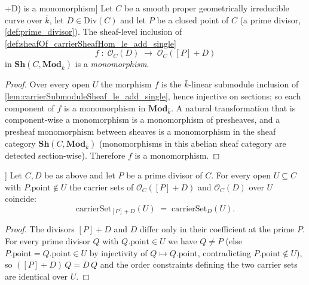 \begin{lemma}

\leanok
[The inclusion \(\mathcal O_C(D) \hookrightarrow \mathcal O_C([P]+D)\) is a
monomorphism]
  \label{lem:sheafOf_mono_single_add}
  Let \(C\) be a smooth proper geometrically irreducible curve over
  \(\bar k\), let \(D \in \mathrm{Div}(C)\) and let \(P\) be a closed point of
  \(C\) (a prime divisor, \cref{def:prime_divisor}). The sheaf-level inclusion
  of \cref{def:sheafOf_carrierSheafHom_le_add_single}
  \[
    f \;\colon\; \mathcal O_C(D) \;\longrightarrow\; \mathcal O_C([P]+D)
  \]
  in \(\mathbf{Sh}(C, \mathbf{Mod}_{\bar k})\) is a \emph{monomorphism}.
\end{lemma}

\begin{proof}
  Over every open \(U\) the morphism \(f\) is the \(\bar k\)-linear submodule
  inclusion of \cref{lem:carrierSubmoduleSheaf_le_add_single}, hence injective
  on sections; so each component of \(f\) is a monomorphism in
  \(\mathbf{Mod}_{\bar k}\). A natural transformation that is component-wise a
  monomorphism is a monomorphism of presheaves, and a presheaf monomorphism
  between sheaves is a monomorphism in the sheaf category
  \(\mathbf{Sh}(C, \mathbf{Mod}_{\bar k})\) (monomorphisms in this abelian
  sheaf category are detected section-wise). Therefore \(f\) is a monomorphism.
\end{proof}

\begin{lemma}\leanok
[Away from \(P\): the carrier set is unchanged by \([P]\)]
  \label{lem:carrierSet_add_single_eq_of_not_mem}
  Let \(C, D\) be as above and let \(P\) be a prime divisor of \(C\). For every
  open \(U \subseteq C\) with \(P.\mathrm{point} \notin U\) the carrier sets of
  \(\mathcal O_C([P]+D)\) and \(\mathcal O_C(D)\) over \(U\) coincide:
  \[
    \mathrm{carrierSet}_{[P]+D}(U) \;=\; \mathrm{carrierSet}_D(U).
  \]
\end{lemma}

\begin{proof}
  The divisors \([P]+D\) and \(D\) differ only in their coefficient at the prime
  \(P\). For every prime divisor \(Q\) with \(Q.\mathrm{point} \in U\) we have
  \(Q \neq P\) (else \(P.\mathrm{point} = Q.\mathrm{point} \in U\) by injectivity
  of \(Q \mapsto Q.\mathrm{point}\), contradicting \(P.\mathrm{point} \notin U\)), so \(([P]+D)\,Q = D\,Q\) and the
  order constraints defining the two carrier sets are identical over \(U\).
\end{proof}

